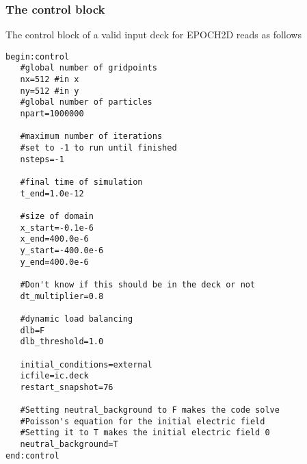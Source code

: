 \documentclass[12pt]{article}
\newcommand{\simpleboxverbatim}{\begin{Verbatim}[obeytabs=true,frame=single,
  framerule=0.5mm,rulecolor=\color{warwickmid}]}
\begin{document}
\subsubsection{The control block}
The control block of a valid input deck for EPOCH2D reads as follows\\
\simpleboxverbatim
begin:control
   #global number of gridpoints
   nx=512 #in x
   ny=512 #in y
   #global number of particles
   npart=1000000

   #maximum number of iterations
   #set to -1 to run until finished
   nsteps=-1

   #final time of simulation
   t_end=1.0e-12

   #size of domain
   x_start=-0.1e-6
   x_end=400.0e-6
   y_start=-400.0e-6
   y_end=400.0e-6

   #Don't know if this should be in the deck or not
   dt_multiplier=0.8

   #dynamic load balancing
   dlb=F
   dlb_threshold=1.0

   initial_conditions=external
   icfile=ic.deck
   restart_snapshot=76

   #Setting neutral_background to F makes the code solve
   #Poisson's equation for the initial electric field
   #Setting it to T makes the initial electric field 0
   neutral_background=T
end:control
\end{Verbatim}
\end{document}
